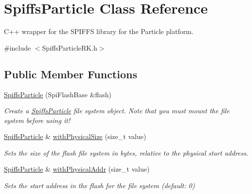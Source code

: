 \hypertarget{class_spiffs_particle}{}\section{Spiffs\+Particle Class Reference}
\label{class_spiffs_particle}


C++ wrapper for the S\+P\+I\+F\+FS library for the Particle platform.  




{\ttfamily \#include $<$Spiffs\+Particle\+R\+K.\+h$>$}

\subsection*{Public Member Functions}
\begin{DoxyCompactItemize}
\item 
\mbox{\hyperlink{class_spiffs_particle_a3c3749f4cfae7c6ef1721b84e0964a56}{Spiffs\+Particle}} (Spi\+Flash\+Base \&flash)
\begin{DoxyCompactList}\small\item\em Create a \mbox{\hyperlink{class_spiffs_particle}{Spiffs\+Particle}} file system object. Note that you must mount the file system before using it! \end{DoxyCompactList}\item 
\mbox{\label{class_spiffs_particle_a6d58b2716f9ae5b1f5508f4e82e8b6c0}} 
\mbox{\hyperlink{class_spiffs_particle}{Spiffs\+Particle}} \& \mbox{\hyperlink{class_spiffs_particle_a6d58b2716f9ae5b1f5508f4e82e8b6c0}{with\+Physical\+Size}} (size\+\_\+t value)
\begin{DoxyCompactList}\small\item\em Sets the size of the flash file system in bytes, relative to the physical start address. \end{DoxyCompactList}\item 
\mbox{\label{class_spiffs_particle_a68685e7a6143d550c1f31f0046187426}} 
\mbox{\hyperlink{class_spiffs_particle}{Spiffs\+Particle}} \& \mbox{\hyperlink{class_spiffs_particle_a68685e7a6143d550c1f31f0046187426}{with\+Physical\+Addr}} (size\+\_\+t value)
\begin{DoxyCompactList}\small\item\em Sets the start address in the flash for the file system (default\+: 0) \end{DoxyCompactList}\item 

\end{DoxyCompactItemize}
